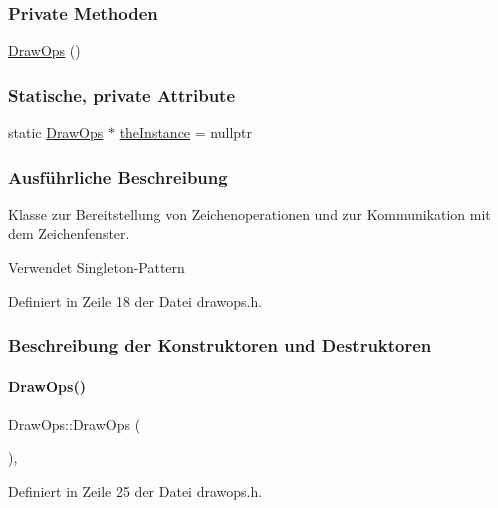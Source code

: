 \subsubsection*{Private Methoden}
\begin{DoxyCompactItemize}
\item 
\mbox{\hyperlink{classDrawOps_a6aeac2fc0eb8bf1c86849aacddaa9ea2}{Draw\+Ops}} ()
\end{DoxyCompactItemize}
\subsubsection*{Statische, private Attribute}
\begin{DoxyCompactItemize}
\item 
static \mbox{\hyperlink{classDrawOps}{Draw\+Ops}} $\ast$ \mbox{\hyperlink{classDrawOps_adb69ea4ed5857e5f173064ad29018e6d}{the\+Instance}} = nullptr
\end{DoxyCompactItemize}


\subsubsection{Ausführliche Beschreibung}
Klasse zur Bereitstellung von Zeichenoperationen und zur Kommunikation mit dem Zeichenfenster. 

Verwendet Singleton-\/\+Pattern 

Definiert in Zeile 18 der Datei drawops.\+h.



\subsubsection{Beschreibung der Konstruktoren und Destruktoren}
\mbox{\label{classDrawOps_a6aeac2fc0eb8bf1c86849aacddaa9ea2}} 
\paragraph{\texorpdfstring{Draw\+Ops()}{DrawOps()}}
{\footnotesize\ttfamily Draw\+Ops\+::\+Draw\+Ops (\begin{DoxyParamCaption}{ }\end{DoxyParamCaption})\hspace{0.3cm}{\ttfamily [inline]}, {\ttfamily [private]}}



Definiert in Zeile 25 der Datei drawops.\+h.




